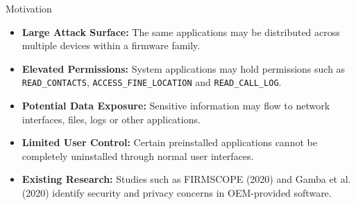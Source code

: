 \documentclass[aspectratio=169,10pt]{beamer}
\begin{document}

\begin{frame}{Motivation}

\begin{itemize}

    \item \textbf{Large Attack Surface:}
    The same applications may be distributed across multiple devices within a firmware family.

    \vspace{5pt}

    \item \textbf{Elevated Permissions:}
    System applications may hold permissions such as
    \texttt{READ\_CONTACTS},
    \texttt{ACCESS\_FINE\_LOCATION} and
    \texttt{READ\_CALL\_LOG}.

    \vspace{5pt}

    \item \textbf{Potential Data Exposure:}
    Sensitive information may flow to network interfaces, files, logs or other applications.

    \vspace{5pt}

    \item \textbf{Limited User Control:}
    Certain preinstalled applications cannot be completely uninstalled through normal user interfaces.

    \vspace{5pt}

    \item \textbf{Existing Research:}
    Studies such as FIRMSCOPE (2020) and Gamba et al. (2020) identify security and privacy concerns in OEM-provided software.

\end{itemize}

\end{frame}

\end{document}
